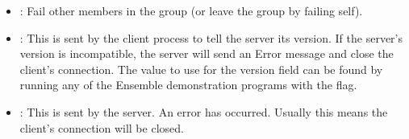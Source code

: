 \begin{itemize}
\begin{FormatTable}
\end{FormatTable}
\item 
{} : Fail other members in the group (or leave the
group by failing self).
\begin{FormatTable}
\end{FormatTable}
\item 
{} : This is sent by the client process to tell
the server its version.  If the server's version is incompatible, the
server will send an Error message and close the client's connection.
The value to use for the version field can be found by running any of
the Ensemble demonstration programs with the  flag.
\begin{FormatTable}
\end{FormatTable}
\item
{} : This is sent by the server.  An error has 
occurred.  Usually this means the client's connection will be closed.
\begin{FormatTable}
\end{FormatTable}

\end{itemize}
